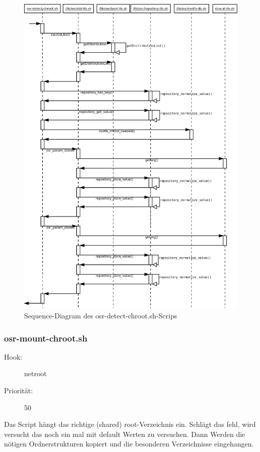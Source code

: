 \documentclass[10pt,a4paper]{article}
\begin{document}
\begin{figure}[H]
 \centering
 \includegraphics[scale=0.30]{./sequence_diagram_osr-detect-chroot_DE_de.png}
 \caption[]{Sequence-Diagram des osr-detect-chroot.sh-Scrips}
\end{figure}

\subsubsection{osr-mount-chroot.sh}
\label{osrmountchroot} 

\begin{description}
\item[Hook:] netroot
\item[Priorität:] 50
\end{description}

Das Script hängt das richtige (shared) root-Verzeichnis ein. Schlägt das fehl, wird versucht das noch ein mal mit default Werten zu versuchen. Dann Werden die nötigen Ordnerstrukturen kopiert und die besonderen Verzeichnisse eingehangen.
\end{document}
